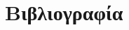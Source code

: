 \chapter{Βιβλιογραφία}
\label{chapter:bibliography}

\begingroup
\let\clearpage\relax
\printbibliography[heading=none]
\endgroup